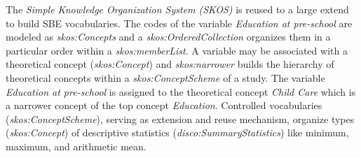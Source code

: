 \documentclass[conference]{IEEEtran}
\begin{document}
The \emph{Simple Knowledge Organization System (SKOS)} is reused to a large extend to build SBE vocabularies.
The codes of the variable \emph{Education at pre-school} are modeled as \emph{skos:Concepts} and 
a \emph{skos:OrderedCollection} organizes them in a particular order within a \emph{skos:memberList}.
A variable may be associated with a theoretical concept (\emph{skos:Concept}) and \emph{skos:narrower} builds the hierarchy of theoretical concepts within a \emph{skos:ConceptScheme} of a study.
The variable \emph{Education at pre-school} is assigned to the theoretical concept \emph{Child Care} which is a narrower concept of the top concept \emph{Education}.
Controlled vocabularies (\emph{skos:ConceptScheme}), serving as extension and reuse mechanism,
organize types (\emph{skos:Concept}) of descriptive statistics (\emph{disco:SummaryStatistics}) like minimum, maximum, and arithmetic mean.
\end{document}
